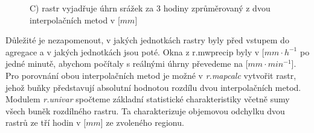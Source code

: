 \documentclass[a4paper,12pt,oneside]{report}
\begin{document}
\begin{figure}[h!]%
    \centering
    \qquad
    \qquad
    \caption[Průměr metod]{ C) rastr vyjadřuje úhrn srážek za 3 hodiny zprůměrovaný z dvou interpolačních metod v [$mm$]\centering}

\end{figure}
Důležité je nezapomenout, v jakých jednotkách rastry byly před vstupem do agregace a v jakých jednotkách jsou poté.
Okna z r.mwprecip  byly v [$mm \cdot h^{-1}$ po jedné minutě, abychom počítaly s reálnými úhrny převedeme na [$mm \cdot min^{-1}$].
Pro porovnání obou interpolačních metod je možné v \textit{r.mapcalc} vytvořit rastr, jehož buňky představují absolutní hodnotou rozdílu dvou interpolačních metod. Modulem \textit{r.univar} spočteme základní statistické charakteristiky včetně sumy všech buněk rozdílného rastru. Ta charakterizuje objemovou odchylku dvou rastrů ze tří hodin v [$mm$] ze zvoleného regionu.
\end{document}
